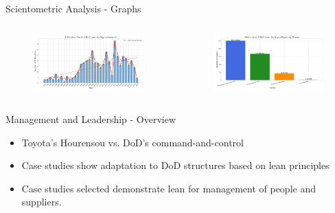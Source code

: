 \documentclass[aspectratio=169,11pt,xcolor={dvipsnames},hyperref={pdftex,pdfpagemode=UseNone,hidelinks,pdfdisplaydoctitle=true},usepdftitle=false]{beamer}
\begin{document}
    \begin{frame}{Scientometric Analysis - Graphs}

      \begin{columns}
        \begin{column}{0.48\textwidth}
          \begin{figure}
                \centering
                \includegraphics[width=\linewidth]{../figures/publication_trend.pdf}
              \end{figure}
          \end{column}
          
        \begin{column}{0.48\textwidth}
          \begin{figure}
                \centering
                \includegraphics[width=\linewidth]{../figures/theme_distribution_bar.pdf}
              \end{figure}
          \end{column}
        \end{columns}

    \end{frame}

    \begin{frame}{Management and Leadership - Overview}
      \begin{itemize}
        \item Toyota's Hourensou vs. DoD's command-and-control
        \item Case studies show adaptation to DoD structures based on lean principles
        \item Case studies selected demonstrate lean for management of people and suppliers.
      \end{itemize}
    \end{frame}
\end{document}
